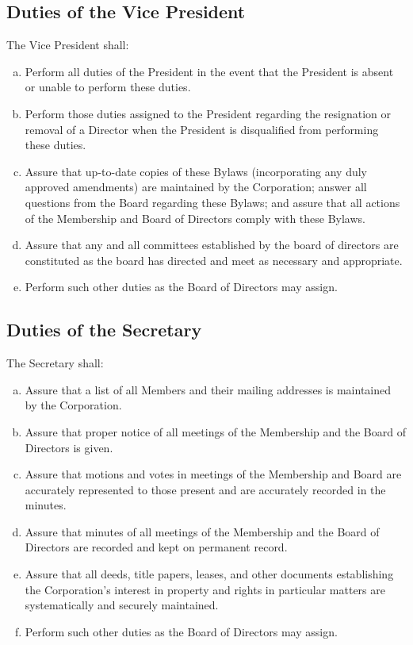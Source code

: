 \subsection{Duties of the Vice President}
The Vice President shall:
\begin{enumerate}[a.]
\item Perform all duties of the President in the event that the
  President is absent or unable to perform these duties.
\item Perform those duties assigned to the President regarding the
  resignation or removal of a Director when the President is
  disqualified from performing these duties.
\item Assure that up-to-date copies of these Bylaws (incorporating any
  duly approved amendments) are maintained by the Corporation; answer
  all questions from the Board regarding these Bylaws; and assure that
  all actions of the Membership and Board of Directors comply with
  these Bylaws.
\item Assure that any and all committees established by the board of
  directors are constituted as the board has directed and meet as
  necessary and appropriate.
\item Perform such other duties as the Board of Directors may assign.
\end{enumerate}

\subsection{Duties of the Secretary}
The Secretary shall:
\begin{enumerate}[a.]
\item Assure that a list of all Members and their mailing addresses is
  maintained by the Corporation.
\item Assure that proper notice of all meetings of the Membership and
  the Board of Directors is given.
\item Assure that motions and votes in meetings of the Membership and
  Board are accurately represented to those present and are accurately
  recorded in the minutes.
\item Assure that minutes of all meetings of the Membership and the
  Board of Directors are recorded and kept on permanent record.
\item Assure that all deeds, title papers, leases, and other documents
  establishing the Corporation's interest in property and rights in
  particular matters are systematically and securely maintained.
\item Perform such other duties as the Board of Directors may assign.
\end{enumerate}

